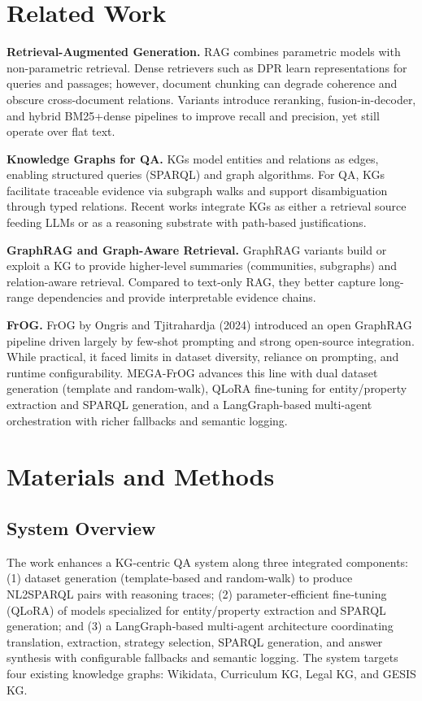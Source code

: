 \documentclass[12pt,a4paper,onecolumn]{article}
\begin{document}
\section*{Related Work}
\textbf{Retrieval-Augmented Generation.} RAG combines parametric models with non-parametric retrieval. Dense retrievers such as DPR learn representations for queries and passages; however, document chunking can degrade coherence and obscure cross-document relations. Variants introduce reranking, fusion-in-decoder, and hybrid BM25+dense pipelines to improve recall and precision, yet still operate over flat text.

\textbf{Knowledge Graphs for QA.} KGs model entities and relations as edges, enabling structured queries (SPARQL) and graph algorithms. For QA, KGs facilitate traceable evidence via subgraph walks and support disambiguation through typed relations. Recent works integrate KGs as either a retrieval source feeding LLMs or as a reasoning substrate with path-based justifications.

\textbf{GraphRAG and Graph-Aware Retrieval.} GraphRAG variants build or exploit a KG to provide higher-level summaries (communities, subgraphs) and relation-aware retrieval. Compared to text-only RAG, they better capture long-range dependencies and provide interpretable evidence chains.

\textbf{FrOG.} FrOG by Ongris and Tjitrahardja (2024) introduced an open GraphRAG pipeline driven largely by few-shot prompting and strong open-source integration. While practical, it faced limits in dataset diversity, reliance on prompting, and runtime configurability. MEGA-FrOG advances this line with dual dataset generation (template and random-walk), QLoRA fine-tuning for entity/property extraction and SPARQL generation, and a LangGraph-based multi-agent orchestration with richer fallbacks and semantic logging.

\section*{Materials and Methods}
\subsection*{System Overview}
The work enhances a KG‑centric QA system along three integrated components: (1) dataset generation (template‑based and random‑walk) to produce NL2SPARQL pairs with reasoning traces; (2) parameter‑efficient fine‑tuning (QLoRA) of models specialized for entity/property extraction and SPARQL generation; and (3) a LangGraph‑based multi‑agent architecture coordinating translation, extraction, strategy selection, SPARQL generation, and answer synthesis with configurable fallbacks and semantic logging. The system targets four existing knowledge graphs: Wikidata, Curriculum KG, Legal KG, and GESIS KG.
\end{document}
